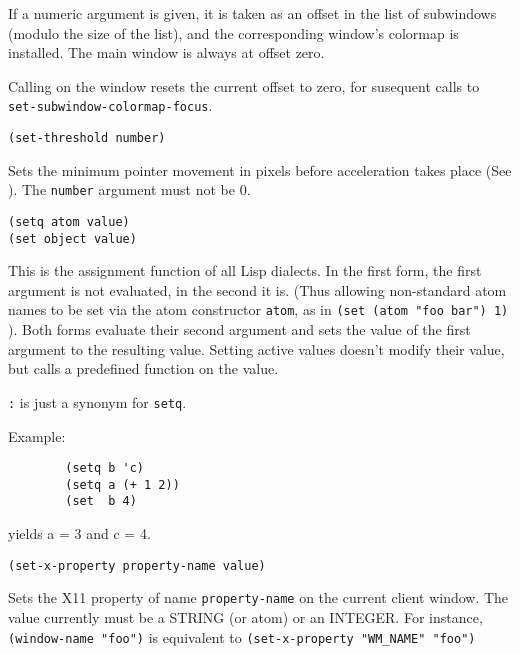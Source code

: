 If a numeric argument is given, it is taken as an offset in the list of
subwindows (modulo the size of the list), and the corresponding window's
colormap is installed. The main window is always at offset zero.

Calling  on the window resets the current offset
to zero, for susequent calls to \verb"set-subwindow-colormap-focus".


        
{\usagefont\begin{verbatim}
(set-threshold number)
\end{verbatim}}\usageupspace

Sets the minimum pointer movement in pixels before acceleration takes place
(See ). The \verb"number" argument must not be 0.

        
{\usagefont\begin{verbatim}
(setq atom value)
(set object value)
\end{verbatim}}\usageupspace

This is the assignment function of all Lisp dialects. In the first form,
the first argument is not evaluated, in the second it is.
(Thus allowing non-standard atom names to be set via the atom constructor
\verb"atom", as in \verb|(set (atom "foo bar") 1)| ). Both forms evaluate 
their second
argument and sets the value of the first argument to the resulting
value. Setting active values
doesn't modify their value, but calls a predefined function on the value.

\verb":" is just a synonym for \verb"setq".

Example:{\exemplefont\upspace\begin{verbatim}
        (setq b 'c)
        (setq a (+ 1 2))
        (set  b 4)
\end{verbatim}}
yields a = 3 and c = 4.

        
{\usagefont\begin{verbatim}
(set-x-property property-name value)
\end{verbatim}}\usageupspace

Sets the X11 property of name \verb"property-name" on  the current client
window.  The value currently must be a STRING (or atom) or an INTEGER.  For
instance, \verb|(window-name "foo")| is equivalent to 
\verb|(set-x-property "WM_NAME" "foo")|

